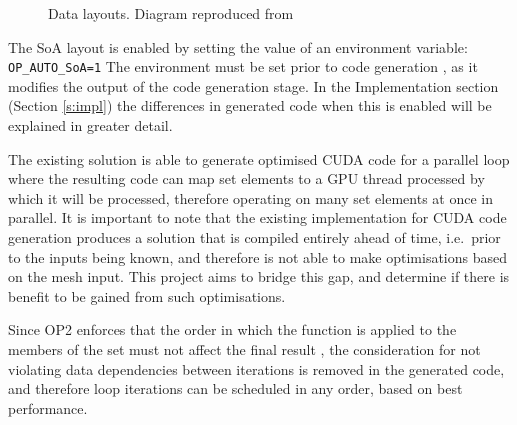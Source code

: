 \begin{figure}[h]
  \centering

  \quad

  \caption{\label{fig:SoA_v_AoS} Data layouts. Diagram reproduced from \cite{gpudesign}}
\end{figure}

\noindent The SoA layout is enabled by setting the value of an environment variable:\\ \verb|OP_AUTO_SoA=1|
The environment must be set prior to code generation \cite[p13]{manual}, as it modifies the output of the code generation stage. In the Implementation section (Section \ref{s:impl}) the differences in generated code when this is enabled will be explained in greater detail.
\par
The existing solution is able to generate optimised CUDA code for a parallel loop where the resulting code can map set elements to a GPU thread processed by which it will be processed, therefore operating on many set elements at once in parallel. It is important to note that the existing implementation for CUDA code generation produces a solution that is compiled entirely ahead of time, i.e.\ prior to the inputs being known, and therefore is not able to make optimisations based on the mesh input. This project aims to bridge this gap, and determine if there is benefit to be gained from such optimisations.
\par
Since OP2 enforces that the order in which the function is applied to the members of the set must not affect the final result \cite[p4]{manual}, the consideration for not violating data dependencies between iterations is removed in the generated code, and therefore loop iterations can be scheduled in any order, based on best performance.

